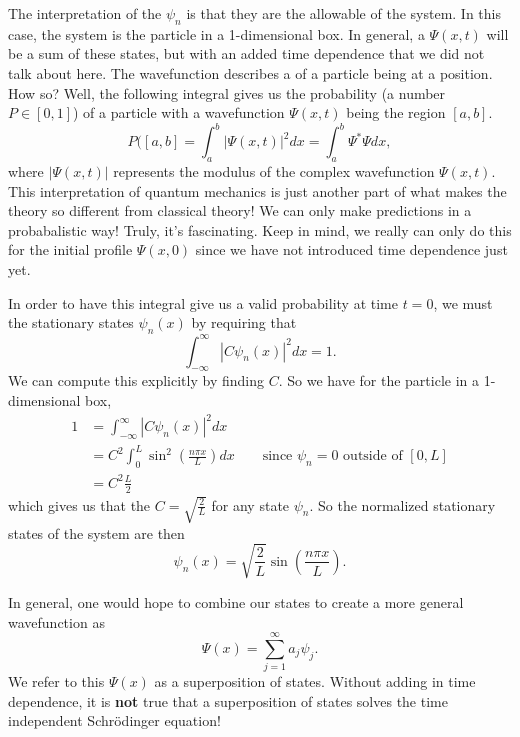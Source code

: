 The interpretation of the $\psi_n$ is that they are the allowable  of the system. In this case, the system is the particle in a 1-dimensional box. In general, a  $\Psi(x,t)$ will be a sum of these states, but with an added time dependence that we did not talk about here. The wavefunction describes a  of a particle being at a position.  How so? Well, the following integral gives us the probability (a number $P\in [0,1]$) of a particle with a wavefunction $\Psi(x,t)$ being the region $[a,b]$.  
\[
P([a,b]=\int_a^b |\Psi(x,t)|^2 dx=\int_a^b \Psi^* \Psi dx,
\]
where $|\Psi(x,t) |$ represents the modulus of the complex wavefunction $\Psi(x,t)$. This interpretation of quantum mechanics is just another part of what makes the theory so different from classical theory! We can only make predictions in a probabalistic way! Truly, it's fascinating. Keep in mind, we really can only do this for the initial profile $\Psi(x,0)$ since we have not introduced time dependence just yet.

In order to have this integral give us a valid probability at time $t=0$, we must  the stationary states $\psi_n(x)$ by requiring that
\[
\int_{-\infty}^\infty |C\psi_n(x)|^2dx=1.
\]
We can compute this explicitly by finding $C$. So we have for the particle in a 1-dimensional box,
\begin{align*}
    1&= \int_{-\infty}^\infty |C\psi_n(x)|^2dx\\
    &= C^2\int_{0}^L \sin^2\left(\frac{n\pi x}{L}\right)dx \qquad \textrm{since $\psi_n=0$ outside of $[0,L]$}\\
    &= C^2 \frac{L}{2}
\end{align*}
which gives us that the  $C=\sqrt{\frac{2}{L}}$ for any state $\psi_n$. So the normalized stationary states of the system are then
\[
\boxed{\psi_n(x) = \sqrt{\frac{2}{L}}\sin\left(\frac{n\pi x}{L}\right).}
\]

In general, one would hope to combine our states to create a more general wavefunction as
\[
\Psi(x) = \sum_{j=1}^\infty a_j \psi_j.
\]
We refer to this $\Psi(x)$ as a superposition of states.  Without adding in time dependence, it is \textbf{not} true that a superposition of states solves the time independent Schr\"odinger equation! 

